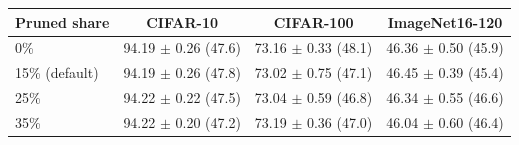 \begin{tabular}{@{}lccc@{}}
\toprule
Pruned share & CIFAR-10 & CIFAR-100 & ImageNet16-120\\
\midrule
0\% & 94.19 $\pm$ 0.26 (47.6) & 73.16 $\pm$ 0.33 (48.1) & 46.36 $\pm$ 0.50 (45.9)\\
15\% (default) & 94.19 $\pm$ 0.26 (47.8) & 73.02 $\pm$ 0.75 (47.1) & 46.45 $\pm$ 0.39 (45.4)\\
25\% & 94.22 $\pm$ 0.22 (47.5) & 73.04 $\pm$ 0.59 (46.8) & 46.34 $\pm$ 0.55 (46.6)\\
35\% & 94.22 $\pm$ 0.20 (47.2) & 73.19 $\pm$ 0.36 (47.0) & 46.04 $\pm$ 0.60 (46.4)\\
\bottomrule
\end{tabular}
